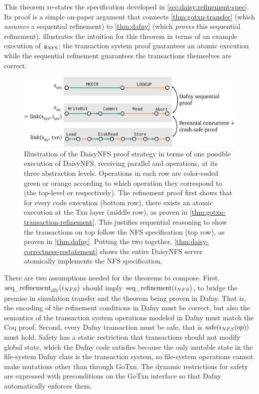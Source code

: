 This theorem re-states the specification developed in
\cref{sec:daisy:refinement-spec}. Its proof is a simple on-paper argument that
connects \cref{thm:gotxn-transfer} (which \emph{assumes} a sequential
refinement) to \cref{thm:dafny} (which \emph{proves} this sequential refinement).
 illustrates
the intuition for this theorem in terms of an example execution of $\texttt{s}_{\mathrm{NFS}}$: the transaction system proof guarantees an
atomic execution while the sequential refinement guarantees the transactions
themselves are correct.

\begin{figure}
  \centering
  \includegraphics{fig/refinement-execs.png}
  \caption[Overall DaisyNFS proof strategy]{Illustration of the DaisyNFS proof
    strategy in terms of one
    possible execution of DaisyNFS, receiving parallel  and 
    operations, at its three abstraction levels. Operations in each row are
    color-coded green or orange according to which operation they correspond to
    (the top-level  or  respectively). The refinement proof first
    shows that for every code execution (bottom row), there exists an atomic
    execution at the Txn layer (middle row), as proven in
    \cref{thm:gotxn-transaction-refinement}. This justifies sequential reasoning to
    show the transactions on top follow the NFS specification (top row), as
    proven in \cref{thm:dafny}. Putting the two together,
    \cref{thm:daisy-correctness-restatement} shows the entire DaisyNFS server atomically
    implements the NFS specification.}
  \label{fig:refinement-execs}
\end{figure}

There are two assumptions needed for the theorems to compose. First,
$\operatorname{seq\_refinement}_{\mathrm{dfy}}(i_{NFS})$ should imply $\operatorname{seq\_refinement}(i_{NFS})$,
to bridge the premise in simulation transfer and the theorem being proven in
Dafny. That is, the
encoding of the refinement conditions in Dafny must be correct, but also the
semantics of the transaction system operations modeled in Dafny must match the
Coq proof. Second, every Dafny transaction must be safe, that is
$\mathrm{safe}(i_{NFS}(op))$ must hold. Safety has a static restriction that transactions
should not modify global state, which the Dafny code satisfies because the only
mutable state in the file-system Dafny class is the transaction system, so
file-system operations cannot make mutations other than through GoTxn. The
dynamic restrictions for safety are expressed with preconditions on the GoTxn
interface so that Dafny automatically enforces them.

